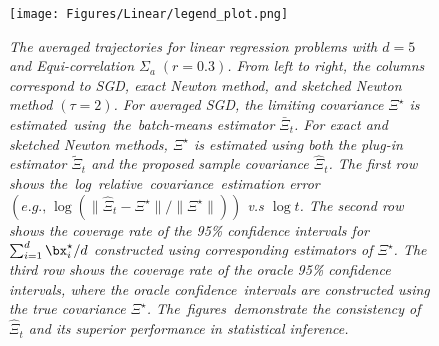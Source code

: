 \begin{figure}[!htp]
\centering     %
{}
\vskip5pt
	
\vskip5pt
	
\vskip5pt
\vskip5pt
\texttt{[image: Figures/Linear/legend\_plot.png]}
\caption{\textit{
The averaged trajectories for linear regression problems with $d=5$ and Equi-correlation $\Sigma_a \;(r=0.3)$. From left to right, the columns correspond to SGD, exact Newton method, and sketched Newton method $(\tau = 2)$. For averaged SGD, the limiting covariance $\Xi^\star$ is estimated~using~the~batch-means estimator $\bar{\Xi}_t$. For exact and sketched Newton methods, $\Xi^\star$ is estimated using both the plug-in estimator $\tilde{\Xi}_t$ and the proposed sample covariance $\hat{\Xi}_t$. 
The first row shows the~log~\mbox{relative}~\mbox{covariance}~estimation error $(\textit{e.g.,}\; \log(\|\hat{\Xi}_t-\Xi^\star\|/\|\Xi^\star\|))$ v.s $\log t$. The second row shows the coverage rate of the 95\% confidence intervals for $\sum_{i=1}^d\bx^{\star}_i/d$ constructed using corresponding estimators of $\Xi^\star$. The third row shows the coverage rate of the oracle 95\% confidence intervals, where the oracle confidence~intervals are constructed using the true covariance $\Xi^\star$. The~figures~demonstrate the consistency of $\hat{\Xi}_t$ and its superior performance in statistical inference.}}\label{fig:1}
\end{figure}



